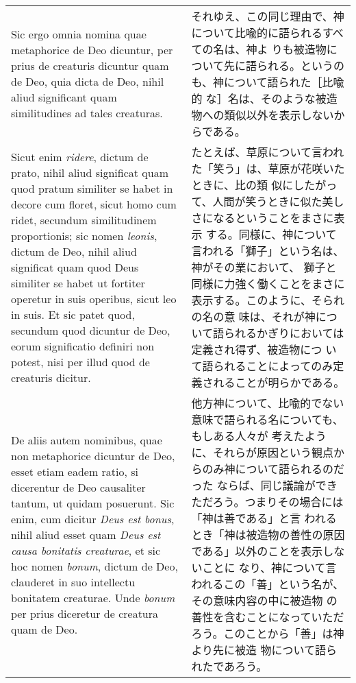 \documentclass[10pt]{jsarticle}
\begin{document}
\begin{longtable}{p{21em}p{21em}}
\\

Sic ergo omnia nomina quae metaphorice de Deo dicuntur, per prius de
creaturis dicuntur quam de Deo, quia dicta de Deo, nihil aliud
significant quam similitudines ad tales creaturas.

&

それゆえ、この同じ理由で、神について比喩的に語られるすべての名は、神よ
りも被造物について先に語られる。というのも、神について語られた［比喩的
な］名は、そのような被造物への類似以外を表示しないからである。

\\

Sicut enim {\itshape ridere}, dictum de prato, nihil aliud significat
quam quod pratum similiter se habet in decore cum floret, sicut homo
cum ridet, secundum similitudinem proportionis; sic nomen {\itshape
leonis}, dictum de Deo, nihil aliud significat quam quod Deus
similiter se habet ut fortiter operetur in suis operibus, sicut leo in
suis. Et sic patet quod, secundum quod dicuntur de Deo, eorum
significatio definiri non potest, nisi per illud quod de creaturis
dicitur.

&

たとえば、草原について言われた「笑う」は、草原が花咲いたときに、比の類
似にしたがって、人間が笑うときに似た美しさになるということをまさに表示
する。同様に、神について言われる「獅子」という名は、神がその業において、
獅子と同様に力強く働くことをまさに表示する。このように、そられの名の意
味は、それが神について語られるかぎりにおいては定義され得ず、被造物につ
いて語られることによってのみ定義されることが明らかである。

\\

De aliis autem nominibus, quae non metaphorice dicuntur de Deo, esset
etiam eadem ratio, si dicerentur de Deo causaliter tantum, ut quidam
posuerunt. Sic enim, cum dicitur {\itshape Deus est bonus}, nihil
aliud esset quam {\itshape Deus est causa bonitatis creaturae}, et sic
hoc nomen {\itshape bonum}, dictum de Deo, clauderet in suo intellectu
bonitatem creaturae. Unde {\itshape bonum} per prius diceretur de
creatura quam de Deo.

&

他方神について、比喩的でない意味で語られる名についても、もしある人々が
考えたように、それらが原因という観点からのみ神について語られるのだった
ならば、同じ議論ができただろう。つまりその場合には「神は善である」と言
われるとき「神は被造物の善性の原因である」以外のことを表示しないことに
なり、神について言われるこの「善」という名が、その意味内容の中に被造物
の善性を含むことになっていただろう。このことから「善」は神より先に被造
物について語られたであろう。


\end{longtable}
\end{document}
